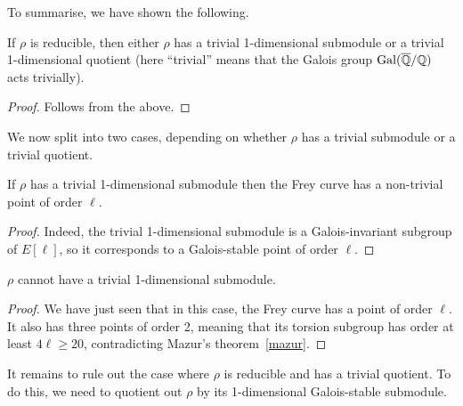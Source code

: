 To summarise, we have shown the following.
\begin{theorem}\label{Frey_curve_reducible_structure} If $\rho$ is reducible, then either $\rho$
  has a trivial 1-dimensional submodule or a trivial 1-dimensional quotient (here ``trivial'' means
  that the Galois group $\operatorname{Gal}(\overline{\mathbb{Q}}/\mathbb{Q})$ acts trivially).
\end{theorem}
\begin{proof} Follows from the above.
\end{proof}

We now split into two cases, depending on whether $\rho$ has a trivial submodule or a trivial quotient.

\begin{lemma}\label{Frey_curve_trivial_submodule} If $\rho$ has a trivial 1-dimensional submodule then the
  Frey curve has a non-trivial point of order $\ell$.
\end{lemma}
\begin{proof} Indeed, the trivial 1-dimensional submodule is a Galois-invariant subgroup of $E[\ell]$, so
  it corresponds to a Galois-stable point of order $\ell$.
\end{proof}

\begin{corollary}\label{Frey_curve_no_trivial_submodule} $\rho$ cannot have a trivial 1-dimensional submodule.
\end{corollary}
\begin{proof}
  We have just seen that in this case, the Frey curve has a point of order $\ell$.
  It also has three points of order 2, meaning that its torsion subgroup has order at least
  $4\ell\geq 20$, contradicting Mazur's theorem~\ref{mazur}.
\end{proof}

It remains to rule out the case where $\rho$ is reducible and has a trivial quotient. To do this, we need
to quotient out $\rho$ by its 1-dimensional Galois-stable submodule.

